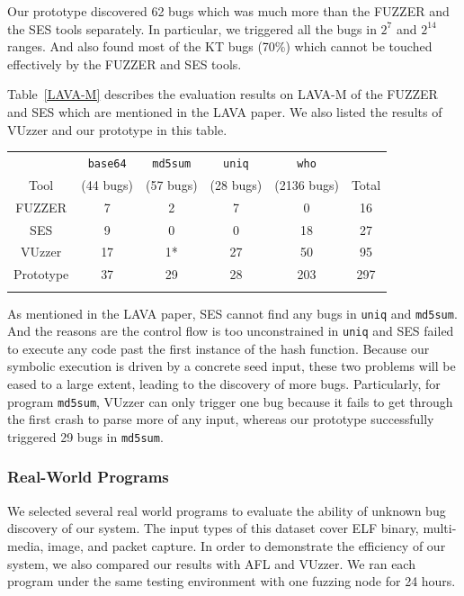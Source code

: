 Our prototype discovered 62 bugs which was much more than the FUZZER and the SES tools separately. In particular, we triggered all the bugs in $2^7$ and $2^{14}$ ranges. And also found most of the KT bugs (70\%) which cannot be touched effectively by the FUZZER and SES tools. 

Table~\ref{LAVA-M} describes the evaluation results on LAVA-M of the FUZZER and SES which are mentioned in the LAVA paper. We also listed the results of VUzzer and our prototype in this table. 
\begin{table}[!b]
{\begin{tabular*}{20pc}{@{\extracolsep{\fill}}cccccc@{}}\toprule
	     & \texttt{base64} & \texttt{md5sum} & \texttt{uniq} & \texttt{who} &   \\
	     Tool    & (44 bugs) & (57 bugs) & (28 bugs) & (2136 bugs) &  Total\\
\midrule
		FUZZER 		& 7  & 2  & 7    & 0   & 16  \\
		SES	        & 9  & 0  & 0    & 18  & 27  \\
		VUzzer		& 17 & 1* & 27   & 50  & 95 \\
		Prototype	& 37 & 29 & 28   & 203 & 297 \\
\botrule
\end{tabular*}}{}
\end{table}


As mentioned in the LAVA paper, SES cannot find any bugs in \texttt{uniq} and \texttt{md5sum}. And the reasons are the control flow is too unconstrained in \texttt{uniq} and SES failed to execute any code past the first instance of the hash function. Because our symbolic execution is driven by a concrete seed input, these two problems will be eased to a large extent, leading to the discovery of more bugs. Particularly, for program \texttt{md5sum}, VUzzer can only trigger one bug because it fails to get through the first crash to parse more of any input, whereas our prototype successfully triggered 29 bugs in \texttt{md5sum}.

\subsubsection{Real-World Programs}
We selected several real world programs to evaluate the ability of unknown bug discovery of our system. The input types of this dataset cover ELF binary, multi-media, image, and packet capture. In order to demonstrate the efficiency of our system, we also compared our results with AFL and VUzzer. We ran each program under the same testing environment with one fuzzing node for 24 hours. 

